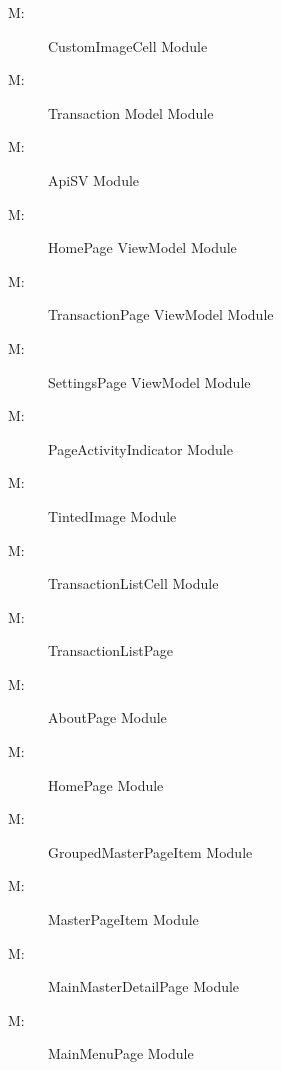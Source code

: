 \documentclass[12pt, titlepage]{article}
\newcounter{mnum}
\newcommand{\mthemnum}{M\themnum}
\begin{document}
\begin{description}
\item [ \mthemnum \label{m1}:] CustomImageCell Module
\item [ \mthemnum \label{m2}:] Transaction Model Module
\item [ \mthemnum \label{m3}:] ApiSV Module
\item [ \mthemnum \label{m4}:] HomePage ViewModel Module
\item [ \mthemnum \label{m5}:] TransactionPage ViewModel Module
\item [ \mthemnum \label{m6}:] SettingsPage ViewModel Module
\item [ \mthemnum \label{m7}:] PageActivityIndicator Module
\item [ \mthemnum \label{m8}:] TintedImage Module
\item [ \mthemnum \label{m9}:] TransactionListCell Module
\item [ \mthemnum \label{m10}:] TransactionListPage
\item [ \mthemnum \label{m11}:] AboutPage Module
\item [ \mthemnum \label{m12}:] HomePage Module
\item [ \mthemnum \label{m13}:] GroupedMasterPageItem Module
\item [ \mthemnum \label{m14}:] MasterPageItem Module
\item [ \mthemnum \label{m15}:] MainMasterDetailPage Module
\item [ \mthemnum \label{m16}:] MainMenuPage Module
\end{description}
\end{document}
